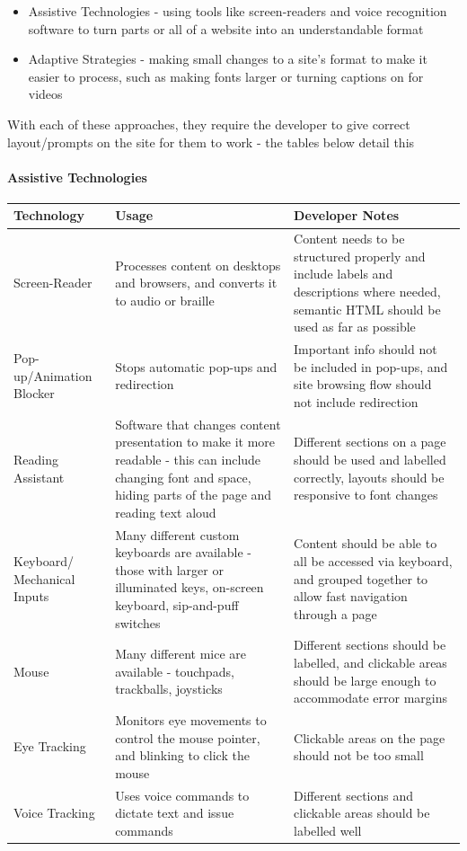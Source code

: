 \documentclass[ %
                    author={Aleena Baig},
                supervisor={Dr Simon Lock},
                    degree={BSc},
                     title={On Making Web Accessible Graphs},
                  subtitle={},
                      year={2019} ]{dissertation}
\begin{document}
\begin{itemize}
    \item Assistive Technologies - using tools like screen-readers and voice recognition software to turn parts or all of a website into an understandable format
    \item Adaptive Strategies - making small changes to a site's format to make it easier to process, such as making fonts larger or turning captions on for videos
\end{itemize}

With each of these approaches, they require the developer to give correct layout/prompts on the site for them to work - the tables below detail this

\paragraph{Assistive Technologies}

\begin{center}
\begin{longtable}{|p{3cm}|p{5cm}|p{5cm}|}
 \hline
 Technology & Usage & Developer Notes \\ [0.5ex]
 \hline \hline
 Screen-Reader & Processes content on desktops and browsers, and converts it to audio or braille & Content needs to be structured properly and include labels and descriptions where needed, semantic HTML should be used as far as possible \\
 \hline
 Pop-up/Animation Blocker & Stops automatic pop-ups and redirection & Important info should not be included in pop-ups, and site browsing flow should not include redirection \\
 \hline
 Reading Assistant & Software that changes content presentation to make it more readable - this can include changing font and space, hiding parts of the page and reading text aloud & Different sections on a page should be used and labelled correctly, layouts should be responsive to font changes \\
 \hline
 Keyboard/ Mechanical Inputs & Many different custom keyboards are available - those with larger or illuminated keys, on-screen keyboard, sip-and-puff switches  & Content should be able to all be accessed via keyboard, and grouped together to allow fast navigation through a page \\
 \hline
 Mouse & Many different mice are available - touchpads, trackballs, joysticks & Different sections should be labelled, and clickable areas should be large enough to accommodate error margins\\
 \hline
 Eye Tracking & Monitors eye movements to control the mouse pointer, and blinking to click the mouse & Clickable areas on the page should not be too small \\
 \hline
 Voice Tracking & Uses voice commands to dictate text and issue commands & Different sections and clickable areas should be labelled well \\ [1ex]
 \hline
\end{longtable}
\end{center}
\end{document}
